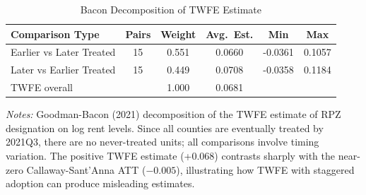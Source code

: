\begin{table}[t]
\centering
\caption{Bacon Decomposition of TWFE Estimate}
\label{tab:bacon}
\begin{tabular}{lccccc}
\toprule
Comparison Type & Pairs & Weight & Avg.~Est. & Min & Max \\
\midrule
Earlier vs Later Treated & 15 & 0.551 & 0.0660 & -0.0361 & 0.1057 \\
Later vs Earlier Treated & 15 & 0.449 & 0.0708 & -0.0358 & 0.1184 \\
\midrule
TWFE overall & & 1.000 & 0.0681 & & \\
\bottomrule
\end{tabular}
\par\vspace{0.3em}\begin{minipage}{\textwidth}\footnotesize
\textit{Notes:} Goodman-Bacon (2021) decomposition of the TWFE estimate of RPZ designation on log rent levels. Since all counties are eventually treated by 2021Q3, there are no never-treated units; all comparisons involve timing variation. The positive TWFE estimate (+0.068) contrasts sharply with the near-zero Callaway-Sant'Anna ATT ($-0.005$), illustrating how TWFE with staggered adoption can produce misleading estimates.
\end{minipage}
\end{table}

